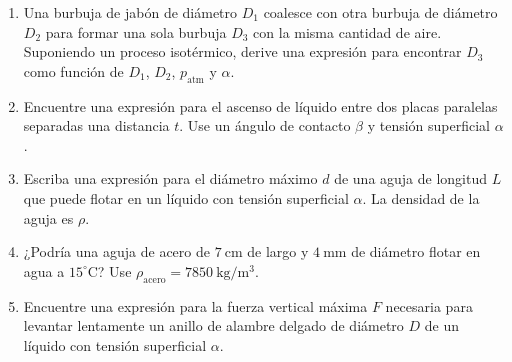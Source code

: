 \begin{enumerate}
\figuraCapilarPlacas

\item Una burbuja de jabón de diámetro $D_1$ coalesce con otra burbuja de diámetro $D_2$ para formar una sola burbuja $D_3$ con la misma cantidad de aire. Suponiendo un proceso isotérmico, derive una expresión para encontrar $D_3$ como función de $D_1$, $D_2$, $p_{\mathrm{atm}}$ y $\alpha$.

\item Encuentre una expresión para el ascenso de líquido entre dos placas paralelas separadas una distancia $t$. Use un ángulo de contacto $\beta$ y tensión superficial $\alpha$.

\item Escriba una expresión para el diámetro máximo $d$ de una aguja de longitud $L$ que puede flotar en un líquido con tensión superficial $\alpha$. La densidad de la aguja es $\rho$.

\item ¿Podría una aguja de acero de $7\ \mathrm{cm}$ de largo y $4\ \mathrm{mm}$ de diámetro flotar en agua a $15^\circ\mathrm{C}$? Use $\rho_{\mathrm{acero}} = 7850\ \mathrm{kg/m^3}$.

\item Encuentre una expresión para la fuerza vertical máxima $F$ necesaria para levantar lentamente un anillo de alambre delgado de diámetro $D$ de un líquido con tensión superficial $\alpha$.
\end{enumerate}